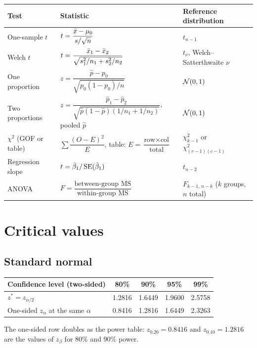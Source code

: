 \begin{center}
\small
\renewcommand{\arraystretch}{1.45}
\begin{tabular}{@{}p{3.4cm}p{6.4cm}p{4.8cm}@{}}
\toprule
Test & Statistic & Reference distribution \\
\midrule
One-sample $t$ & $t=\dfrac{\bar{x}-\mu_0}{s/\sqrt n}$ & $t_{n-1}$ \\
Welch $t$ & $t=\dfrac{\bar{x}_1-\bar{x}_2}{\sqrt{s_1^2/n_1+s_2^2/n_2}}$ & $t_\nu$, Welch--Satterthwaite $\nu$ \\
One proportion & $z=\dfrac{\hat p-p_0}{\sqrt{p_0(1-p_0)/n}}$ & $\mathcal{N}(0,1)$ \\
Two proportions & $z=\dfrac{\hat p_1-\hat p_2}{\sqrt{\hat p(1-\hat p)(1/n_1+1/n_2)}}$, pooled $\hat p$ & $\mathcal{N}(0,1)$ \\
$\chi^2$ (GOF or table) & $\sum \dfrac{(O-E)^2}{E}$, table: $E=\dfrac{\text{row}\times\text{col}}{\text{total}}$ & $\chi^2_{k-1}$ or $\chi^2_{(r-1)(c-1)}$ \\
Regression slope & $t=\hat\beta_1/\operatorname{SE}(\hat\beta_1)$ & $t_{n-2}$ \\
ANOVA & $F=\dfrac{\text{between-group MS}}{\text{within-group MS}}$ & $F_{k-1,\,n-k}$ ($k$ groups, $n$ total) \\
\bottomrule
\end{tabular}
\end{center}

\section{Critical values}

\subsection{Standard normal}

\begin{center}
\small
\begin{tabular}{@{}lcccc@{}}
\toprule
Confidence level (two-sided) & 80\% & 90\% & 95\% & 99\% \\
\midrule
$z^* = z_{\alpha/2}$ & 1.2816 & 1.6449 & 1.9600 & 2.5758 \\
One-sided $z_{\alpha}$ at the same $\alpha$ & 0.8416 & 1.2816 & 1.6449 & 2.3263 \\
\bottomrule
\end{tabular}
\end{center}

The one-sided row doubles as the power table: $z_{0.20}=0.8416$ and $z_{0.10}=1.2816$ are the values of $z_{\beta}$ for 80\% and 90\% power.

